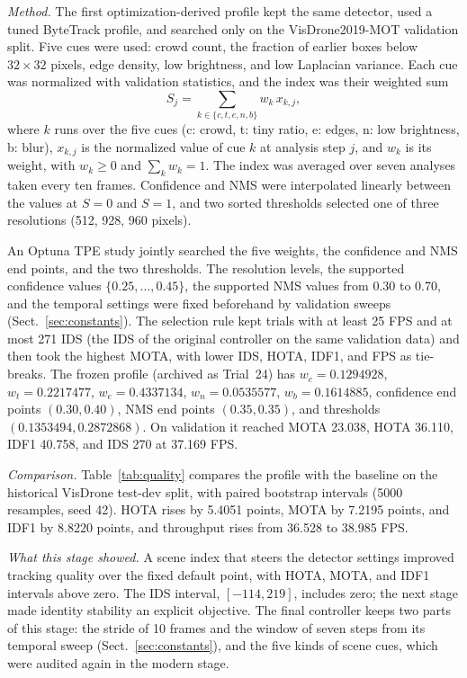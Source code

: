\documentclass[pdflatex,sn-mathphys-num,iicol]{sn-jnl}
\begin{document}
\emph{Method.} The first optimization-derived profile kept the same detector,
used a tuned ByteTrack profile, and searched only on the VisDrone2019-MOT
validation split. Five cues were used: crowd count, the fraction of earlier
boxes below $32\times32$ pixels, edge density, low brightness, and low
Laplacian variance. Each cue was normalized with validation statistics, and
the index was their weighted sum
\begin{equation}
S_j=\sum_{k\in\{c,t,e,n,b\}}w_k\,x_{k,j},
\label{eq:hist-sci}
\end{equation}
where $k$ runs over the five cues (c: crowd, t: tiny ratio, e: edges, n: low
brightness, b: blur), $x_{k,j}$ is the normalized value of cue $k$ at analysis
step $j$, and $w_k$ is its weight, with $w_k\geq0$ and $\sum_k w_k=1$. The
index was averaged over seven analyses taken every ten frames. Confidence and NMS were interpolated linearly between the values
at $S=0$ and $S=1$, and two sorted thresholds selected one of three
resolutions (512, 928, 960 pixels).

An Optuna TPE study \cite{akiba2019optuna} jointly searched the five weights,
the confidence and NMS end points, and the two thresholds. The resolution
levels, the supported confidence values $\{0.25,\dots,0.45\}$, the supported
NMS values from 0.30 to 0.70, and the temporal settings were fixed beforehand
by validation sweeps (Sect.~\ref{sec:constants}). The selection rule kept
trials with at least 25 FPS and at most 271 IDS (the IDS of the original
controller on the same validation data) and then took the highest MOTA, with lower IDS, HOTA,
IDF1, and FPS as tie-breaks. The frozen profile (archived as Trial~24) has
$w_c=0.1294928$, $w_t=0.2217477$, $w_e=0.4337134$, $w_n=0.0535577$,
$w_b=0.1614885$, confidence end points $(0.30,0.40)$, NMS end points
$(0.35,0.35)$, and thresholds $(0.1353494, 0.2872868)$. On validation it
reached MOTA 23.038, HOTA 36.110, IDF1 40.758, and IDS 270 at 37.169 FPS.

\emph{Comparison.} Table~\ref{tab:quality} compares the profile with the
baseline on the historical VisDrone test-dev split, with paired bootstrap
intervals (5000 resamples, seed 42). HOTA rises by 5.4051 points, MOTA by
7.2195 points, and IDF1 by 8.8220 points, and throughput rises from 36.528 to
38.985 FPS.

\emph{What this stage showed.} A scene index that steers the detector settings
improved tracking quality over the fixed default point, with HOTA, MOTA, and
IDF1 intervals above zero. The IDS interval, $[-114, 219]$, includes zero; the
next stage made identity stability an explicit objective. The final
controller keeps two parts of this stage: the stride of 10 frames and the
window of seven steps from its temporal sweep (Sect.~\ref{sec:constants}), and
the five kinds of scene cues, which were audited again in the modern stage.
\end{document}
